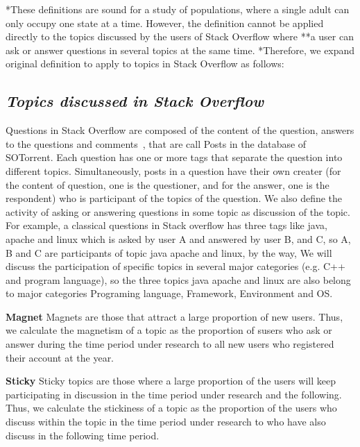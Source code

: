 \documentclass[conference]{IEEEtran}
\begin{document}
*These definitions are sound for a study of populations, where a single adult can only occupy one state at a time. However, the definition cannot be applied directly to the topics discussed by the users of Stack Overflow where **a user can ask or answer questions in several topics at the same time. *Therefore, we expand original definition to apply to topics in Stack Overflow as follows:

\smallskip
\subsection*{\textit{\textbf{Topics discussed in Stack Overflow}}}

Questions in Stack Overflow are composed of the content of the question, answers to the questions and comments~\cite{liu2018mining}, that are call Posts in the database of SOTorrent. Each question has one or more tags that separate the question into different topics. Simultaneously, posts in a question have their own creater (for the content of question, one is the questioner, and for the answer, one is the respondent) who is participant of the topics of the question. We also define the activity of asking or answering questions in some topic as discussion of the topic. For example, a classical questions in Stack overflow has three tags like java, apache and linux which is asked by user A and answered by user B, and C, so A, B and C are participants of topic java apache and linux, by the way, We will discuss the participation of specific topics in several major categories (e.g. C++ and program language), so the three topics java apache and linux are also belong to major categories Programing language, Framework, Environment and OS.
\smallskip

\textbf{Magnet}
Magnets are those that attract a large proportion of new users. Thus, we calculate the magnetism of a topic as the proportion of susers who ask or answer during the time period under research to all new users who registered their account at the year.
\smallskip
\smallskip

\textbf{Sticky}
Sticky topics are those where a large proportion of the users will keep participating in discussion in the time period under research and the following. Thus, we calculate the stickiness of a topic as the proportion of the users who discuss within the topic in the time period under research to who have also discuss in the following time period.
\end{document}
